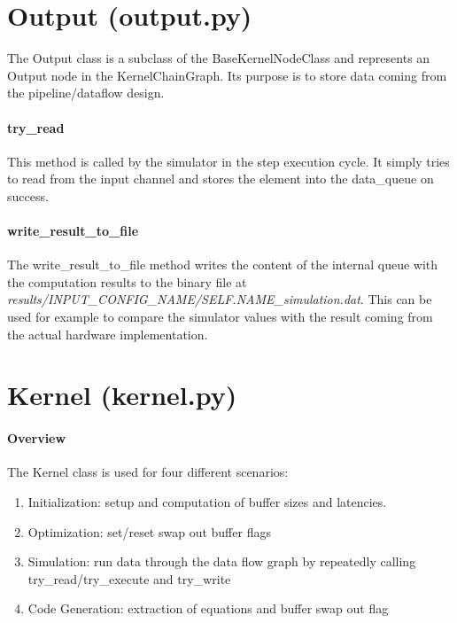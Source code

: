 \section{Output (output.py)}
The Output class is a subclass of the BaseKernelNodeClass and represents an Output node in the KernelChainGraph. Its purpose is to store data coming from the pipeline/dataflow design. 


\paragraph{try\_read}
This method is called by the simulator in the step execution cycle. It simply tries to read from the input channel and stores the element into the data\_queue on success.


\paragraph{write\_result\_to\_file}
The write\_result\_to\_file method writes the content of the internal queue with the computation results to the binary file at \textit{results/INPUT\_CONFIG\_NAME/SELF.NAME\_simulation.dat}. This can be used for example to compare the simulator values with the result coming from the actual hardware implementation.







\section{Kernel (kernel.py)}

\paragraph{Overview}
The Kernel class is used for four different scenarios:
\begin{enumerate}
	\item Initialization: setup and computation of buffer sizes and latencies.
	\item Optimization: set/reset swap out buffer flags
	\item Simulation: run data through the data flow graph by repeatedly calling try\_read/try\_execute and try\_write
	\item Code Generation: extraction of equations and buffer swap out flag
\end{enumerate}


